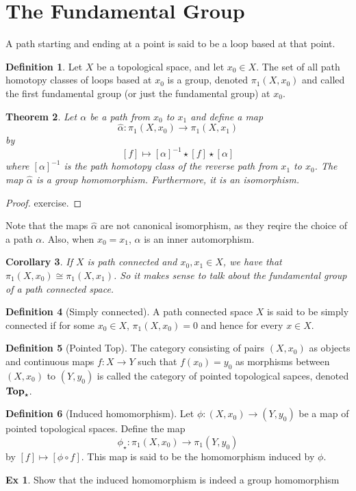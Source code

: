\documentclass[10pt, openany]{book}
\newcommand{\catname}[1]{{\normalfont\textbf{#1}}}
\theoremstyle{plain}
\newtheorem{theorem}{Theorem}[section]
\newtheorem{corollary}[theorem]{Corollary}
\theoremstyle{definition}
\newtheorem{definition}[theorem]{Definition}
\newtheorem{exercise}{Ex}[section]
\theoremstyle{remark}
\begin{document}
\section{The Fundamental Group}
A path starting and ending at a point is said to be a loop based at that point.
\begin{definition}
  Let $X$ be a topological space, and let $x_0\in X$. The set of all path homotopy classes of loops based at $x_0$ is a group, denoted $\pi_1(X,x_0)$ and called the first fundamental group (or just the fundamental group) at $x_0$.
\end{definition}
\begin{theorem}
    Let $\alpha$ be a path from $x_0$ to $x_1$ and define a map $$\hat{\alpha}: \pi_1(X, x_0)\rightarrow \pi_1(X,x_1)$$ by $$[f]\mapsto [\alpha]^{-1}\star[f]\star[\alpha]$$ where $[\alpha]^{-1}$ is the path homotopy class of the reverse path from $x_1$ to $x_0$.  The map $\hat{\alpha}$ is a group homomorphism. Furthermore, it is an isomorphism.
\end{theorem}
\begin{proof}
  exercise.
\end{proof}
Note that the maps $\hat{\alpha}$ are not canonical isomorphism, as they reqire the choice of a path $\alpha$. Also, when $x_0 = x_1$, $\hat{\alpha}$ is an inner automorphism.
\begin{corollary}
  If $X$ is path connected and $x_0,x_1\in X$, we have that $\pi_1(X,x_0)\cong \pi_1(X,x_1)$. So it makes sense to talk about the fundamental group of a path connected space.
\end{corollary}
\begin{definition}[Simply connected]
  A path connected space $X$ is said to be simply connected if for some $x_0\in X$, $\pi_1(X,x_0) = 0$ and hence for every $x\in X$.  
\end{definition}
\begin{definition}[Pointed Top]
  The category consisting of pairs $(X,x_0)$ as objects and continuous maps $f: X\rightarrow Y$ such that $f(x_0) = y_0$ as morphisms between $(X,x_0)$ to $(Y,y_0)$ is called the category of pointed topological sapces, denoted $\catname{Top}_{\star}$.
\end{definition}
\begin{definition}[Induced homomorphism]
Let $\phi: (X,x_0)\rightarrow (Y,y_0)$ be a map of pointed topological spaces. Define the map $$\phi_{\star}:\pi_1(X,x_0)\rightarrow\pi_1(Y,y_0)$$ by $[f]\mapsto [\phi\circ f]$. This map is said to be the homomorphism induced by $\phi$.
\end{definition}
\begin{exercise}
  Show that the induced homomorphism is indeed a group homomorphism
\end{exercise}
\end{document}
